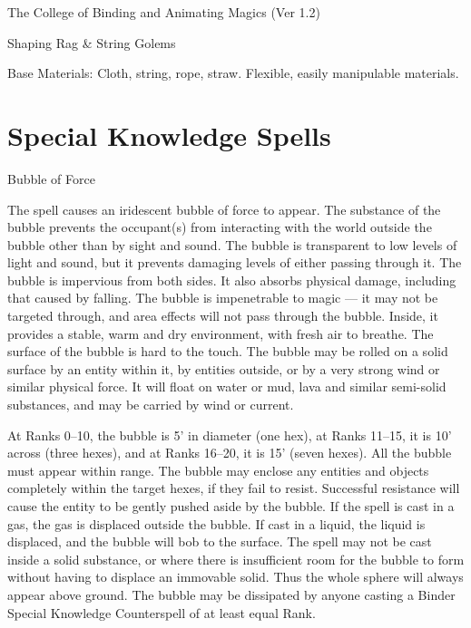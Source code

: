 \begin{Chapter}{The College of Binding and Animating Magics (Ver 1.2)}
\begin{ritual}[Q-4]{Shaping Rag \& String Golems}
\begin{effects}
Base Materials: Cloth, string, rope, straw. Flexible, easily
manipulable materials.
\end{effects}
\end{ritual}

\section{Special Knowledge Spells}

\begin{spell}[S-1]{Bubble of Force}
\begin{effects}
The spell causes an iridescent bubble of force to appear.  The
substance of the bubble prevents the occupant(s) from interacting with
the world outside the bubble other than by sight and sound.  The
bubble is transparent to low levels of light and sound, but it
prevents damaging levels of either passing through it. The bubble is
impervious from both sides.  It also absorbs physical damage,
including that caused by falling.  The bubble is impenetrable to magic
--- it may not be targeted through, and area effects will not pass
through the bubble.  Inside, it provides a stable, warm and dry
environment, with fresh air to breathe. The surface of the bubble is
hard to the touch. The bubble may be rolled on a solid surface by an
entity within it, by entities outside, or by a very strong wind or
similar physical force.  It will float on water or mud, lava and
similar semi-solid substances, and may be carried by wind or current.

At Ranks 0--10, the bubble is 5’ in diameter (one hex), at Ranks
11--15, it is 10’ across (three hexes), and at Ranks 16--20, it is 15’
(seven hexes).  All the bubble must appear within range.  The bubble
may enclose any entities and objects completely within the target
hexes, if they fail to resist.  Successful resistance will cause the
entity to be gently pushed aside by the bubble.  If the spell is cast
in a gas, the gas is displaced outside the bubble.  If cast in a
liquid, the liquid is displaced, and the bubble will bob to the
surface.  The spell may not be cast inside a solid substance, or where
there is insufficient room for the bubble to form without having to
displace an immovable solid.  Thus the whole sphere will always appear
above ground.  The bubble may be dissipated by anyone casting a Binder
Special Knowledge Counterspell of at least equal Rank.
\end{effects}
\end{spell}


\end{Chapter}
